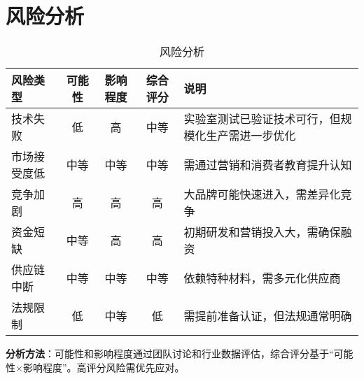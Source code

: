 \documentclass[UTF8]{report}
\theoremstyle{MyLineTheoremStyle} %
\theoremstyle{MyBlockTheoremStyle} %
\theoremstyle{MySubsubsectionStyle} %
\begin{document}
\section{风险分析}
\begin{table}[h]
    \centering
    \begin{tabular}{|l|c|c|c|p{6cm}|}
      \hline
      \textbf{风险类型} & \textbf{可能性} & \textbf{影响程度} & \textbf{综合评分} & \textbf{说明} \\
      \hline
      技术失败       & 低   & 高   & 中等   & 实验室测试已验证技术可行，但规模化生产需进一步优化 \\
      \hline
      市场接受度低   & 中等 & 中等 & 中等   & 需通过营销和消费者教育提升认知 \\
      \hline
      竞争加剧       & 高   & 高   & 高     & 大品牌可能快速进入，需差异化竞争 \\
      \hline
      资金短缺       & 中等 & 高   & 高     & 初期研发和营销投入大，需确保融资 \\
      \hline
      供应链中断     & 中等 & 中等 & 中等   & 依赖特种材料，需多元化供应商 \\
      \hline
      法规限制       & 低   & 中等 & 低     & 需提前准备认证，但法规通常明确 \\
      \hline
    \end{tabular}
    \caption{风险分析}
  \end{table}
  
  \noindent\textbf{分析方法}：可能性和影响程度通过团队讨论和行业数据评估，综合评分基于“可能性×影响程度”。高评分风险需优先应对。  
\end{document}
